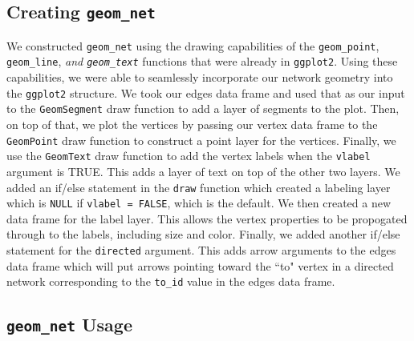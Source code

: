 \documentclass[11pt]{article}\usepackage[]{graphicx}\usepackage[]{color}
\begin{document}
  \subsection{Creating \texttt{geom\_net}}
  We constructed \texttt{geom\_net} using the drawing capabilities of the \texttt{geom\_point}, \texttt{geom\_line}, \emph{and \texttt{geom\_text}} functions that were already in \texttt{ggplot2}.  Using these capabilities, we were able to seamlessly incorporate our network geometry into the \texttt{ggplot2} structure. We took our edges data frame and used that as our input to the \texttt{GeomSegment} draw function to add a layer of segments to the plot.  Then, on top of that, we plot the vertices by passing our vertex data frame to the \texttt{GeomPoint} draw function to construct a point layer for the vertices. Finally, we use the \texttt{GeomText} draw function to add the vertex labels when the \texttt{vlabel} argument is TRUE. This adds a layer of text on top of the other two layers. We added an if/else statement in the \texttt{draw} function which created a labeling layer which is \texttt{NULL} if \texttt{vlabel = FALSE}, which is the default. We then created a new data frame for the label layer. This allows the vertex properties to be propogated through to the labels, including size and color. Finally, we added another if/else statement for the \texttt{directed} argument.  This adds arrow arguments to the edges data frame which will put arrows pointing toward the ``to" vertex in a directed network corresponding to the \texttt{to\_id} value in the edges data frame.

   \subsection{\texttt{geom\_net} Usage}
\end{document}
